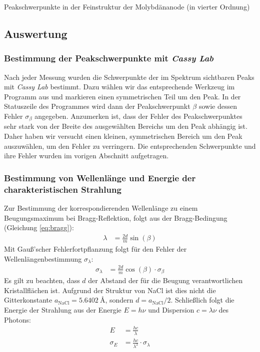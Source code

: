\documentclass[10pt, a4paper]{article}
\begin{document}
\begin{table}[!h]
\centering

\caption{Peakschwerpunkte in der Feinstruktur der Molybdänanode (in vierter Ordnung)}
\label{tab:peakschwerpunkt_feinstruktur}
\end{table}

\newpage
\subsection{Auswertung}

\subsubsection{Bestimmung der Peakschwerpunkte mit \emph{Cassy Lab}}
Nach jeder Messung wurden die Schwerpunkte der im Spektrum sichtbaren Peaks mit \emph{Cassy Lab} bestimmt.
Dazu wählen wir das entsprechende Werkzeug im Programm aus und markieren einen symmetrischen Teil um den Peak.
In der Statuszeile des Programmes wird dann der Peakschwerpunkt $\beta$ sowie dessen Fehler $\sigma_\beta$ angegeben.
Anzumerken ist, dass der Fehler des Peakschwerpunktes sehr stark von der Breite des ausgewählten Bereichs um den Peak abhängig ist.
Daher haben wir versucht einen kleinen, symmetrischen Bereich um den Peak auszuwählen, um den Fehler zu verringern.
Die entsprechenden Schwerpunkte und ihre Fehler wurden im vorigen Abschnitt aufgetragen.

\subsubsection{Bestimmung von Wellenlänge und Energie der charakteristischen Strahlung}
\label{sssec:lambdaE}
Zur Bestimmung der korrespondierenden Wellenlänge zu einem Beugungsmaximum bei Bragg-Reflektion, folgt aus der Bragg-Bedingung (Gleichung \ref{eq:bragg}):
\begin{align}
  \lambda &= \frac{2d}{m} \sin(\beta)
\end{align}
Mit Gauß'scher Fehlerfortpflanzung folgt für den Fehler der Wellenlängenbestimmung $\sigma_\lambda$:
\begin{align}
  \sigma_\lambda &= \frac{2d}{m} \cos(\beta) \cdot \sigma_\beta
\end{align}
Es gilt zu beachten, dass $d$ der Abstand der für die Beugung verantwortlichen Kristallflächen ist.
Aufgrund der Struktur von NaCl ist dies nicht die Gitterkonstante $a_\mathrm{NaCl} = \SI{5,6402}{\angstrom}$\cite{crc}, sondern $d = a_\mathrm{NaCl}/2 $.
Schließlich folgt die Energie der Strahlung aus der Energie $E = h\nu$ und Dispersion $ c = \lambda \nu$ des Photons:
\begin{align}
  E &= \frac{h c}{\lambda} \\
  \sigma_E &= \frac{h c}{\lambda^2} \cdot \sigma_\lambda
\end{align}
\end{document}
